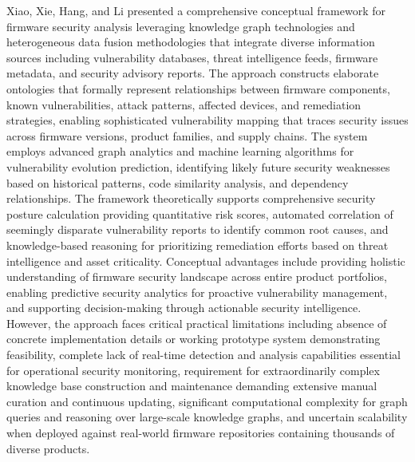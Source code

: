 Xiao, Xie, Hang, and Li presented \cite{xiao2025knowledge} a comprehensive conceptual framework for firmware security analysis leveraging knowledge graph technologies and heterogeneous data fusion methodologies that integrate diverse information sources including vulnerability databases, threat intelligence feeds, firmware metadata, and security advisory reports. The approach constructs elaborate ontologies that formally represent relationships between firmware components, known vulnerabilities, attack patterns, affected devices, and remediation strategies, enabling sophisticated vulnerability mapping that traces security issues across firmware versions, product families, and supply chains. The system employs advanced graph analytics and machine learning algorithms for vulnerability evolution prediction, identifying likely future security weaknesses based on historical patterns, code similarity analysis, and dependency relationships. The framework theoretically supports comprehensive security posture calculation providing quantitative risk scores, automated correlation of seemingly disparate vulnerability reports to identify common root causes, and knowledge-based reasoning for prioritizing remediation efforts based on threat intelligence and asset criticality. Conceptual advantages include providing holistic understanding of firmware security landscape across entire product portfolios, enabling predictive security analytics for proactive vulnerability management, and supporting decision-making through actionable security intelligence. However, the approach faces critical practical limitations including absence of concrete implementation details or working prototype system demonstrating feasibility, complete lack of real-time detection and analysis capabilities essential for operational security monitoring, requirement for extraordinarily complex knowledge base construction and maintenance demanding extensive manual curation and continuous updating, significant computational complexity for graph queries and reasoning over large-scale knowledge graphs, and uncertain scalability when deployed against real-world firmware repositories containing thousands of diverse products.

